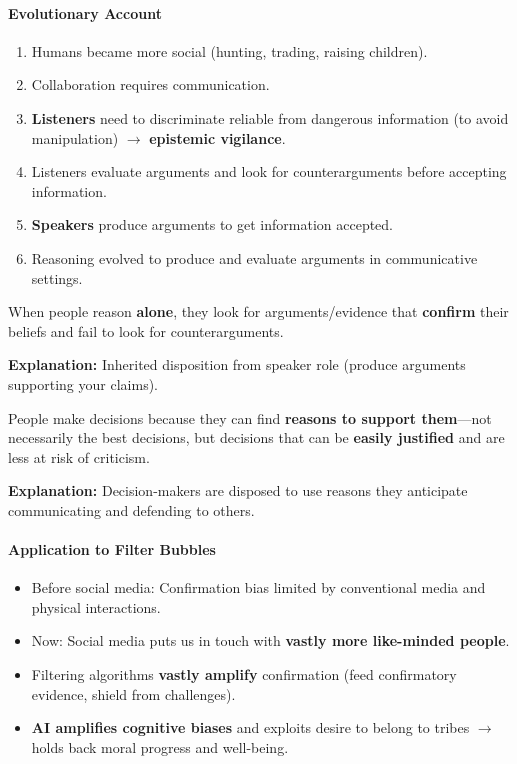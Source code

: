 \paragraph*{Evolutionary Account}

\begin{enumerate}
  \item Humans became more social (hunting, trading, raising children).
  \item Collaboration requires communication.
  \item \textbf{Listeners} need to discriminate reliable from dangerous information (to avoid manipulation) $\to$ \textbf{epistemic vigilance}.
  \item Listeners evaluate arguments and look for counterarguments before accepting information.
  \item \textbf{Speakers} produce arguments to get information accepted.
  \item Reasoning evolved to produce and evaluate arguments in communicative settings.
\end{enumerate}

\begin{defbox}
When people reason \textbf{alone}, they look for arguments/evidence that \textbf{confirm} their beliefs and fail to look for counterarguments.

\textbf{Explanation:} Inherited disposition from speaker role (produce arguments supporting your claims).
\end{defbox}

\begin{defbox}
People make decisions because they can find \textbf{reasons to support them}---not necessarily the best decisions, but decisions that can be \textbf{easily justified} and are less at risk of criticism.

\textbf{Explanation:} Decision-makers are disposed to use reasons they anticipate communicating and defending to others.
\end{defbox}

\paragraph*{Application to Filter Bubbles}

\begin{itemize}
  \item Before social media: Confirmation bias limited by conventional media and physical interactions.
  \item Now: Social media puts us in touch with \textbf{vastly more like-minded people}.
  \item Filtering algorithms \textbf{vastly amplify} confirmation (feed confirmatory evidence, shield from challenges).
  \item \textbf{AI amplifies cognitive biases} and exploits desire to belong to tribes $\to$ holds back moral progress and well-being.
\end{itemize}

